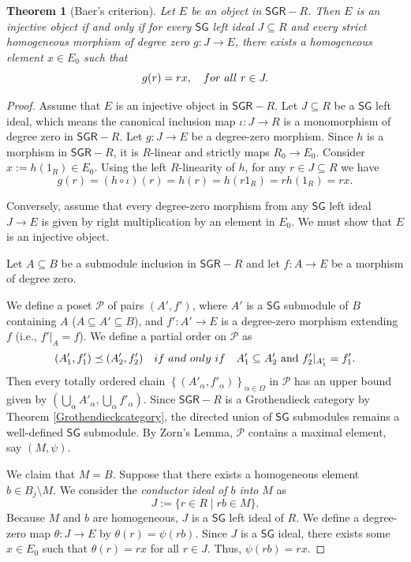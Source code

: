 \documentclass[10pt,a4paper]{amsart}
\newtheorem{theorem}{Theorem}
\begin{document}
\begin{theorem}[Baer's criterion]\label{thm.BaersCriterion}
Let $E$ be an object in $\mathsf{SGR}-R$. Then $E$ is an injective object if and only if for every $\mathsf{SG}$ left ideal $J \subseteq R$ and every strict homogeneous morphism of degree zero $g: J \to E$, there exists a homogeneous element $x \in E_0$ such that 
\[
g(r) = r x, \quad {\rm for\ all } \ r \in J.
\]
\end{theorem}

\begin{proof}
Assume that $E$ is an injective object in $\mathsf{SGR}-R$. Let $J \subseteq R$ be a $\mathsf{SG}$ left ideal, which means the canonical inclusion map $\iota: J \to R$ is a monomorphism of degree zero in $\mathsf{SGR}-R$. Let $g: J \to E$ be a degree-zero morphism. Since $h$ is a morphism in $\mathsf{SGR}-R$, it is $R$-linear and strictly maps $R_0 \to E_0$. Consider $x := h(1_R) \in E_0$. Using the left $R$-linearity of $h$, for any $r \in J \subseteq R$ we have 
\[
g(r) = (h \circ \iota)(r) = h(r) = h(r 1_R) = r h(1_R) = r x.
\]

Conversely, assume that every degree-zero morphism from any $\mathsf{SG}$ left ideal \linebreak $J \to E$ is given by right multiplication by an element in $E_0$. We must show that $E$ is an injective object. 

Let $A \subseteq B$ be a submodule inclusion in $\mathsf{SGR}-R$ and let $f: A \to E$ be a morphism of degree zero. 

We define a poset $\mathcal{P}$ of pairs $(A', f')$, where $A'$ is a $\mathsf{SG}$ submodule of $B$ containing $A$ ($A \subseteq A' \subseteq B$), and $f': A' \to E$ is a degree-zero morphism extending $f$ (i.e., $f'|_{A} = f$). We define a partial order on $\mathcal{P}$ as 
\[
(A'_1, f'_1) \preceq (A'_2, f'_2) \quad {\rm if \ and \ only \ if} \quad A'_1 \subseteq A'_2 \text{ and } f'_2|_{A'_1} = f'_1.
\]
Then every totally ordered chain $\left\{(A'_\alpha, f'_\alpha)\right\}_{\alpha \in \Omega}$ in $\mathcal{P}$ has an upper bound given by $\left(\bigcup_\alpha A'_\alpha, \bigcup_\alpha f'_\alpha\right)$. Since $\mathsf{SGR}-R$ is a Grothendieck category by Theorem \ref{Grothendieckcategory}, the directed union of $\mathsf{SG}$ submodules remains a well-defined $\mathsf{SG}$ submodule. By Zorn's Lemma, $\mathcal{P}$ contains a maximal element, say $(M, \psi)$. 

We claim that $M = B$. Suppose that there exists a homogeneous element $b \in B_j \setminus M$. We consider the {\em conductor ideal of $b$ into} $M$ as
\[
J := \{ r \in R \mid r b \in M \}.
\]
Because $M$ and $b$ are homogeneous, $J$ is a $\mathsf{SG}$ left ideal of $R$. We define a degree-zero map $\theta: J \to E$ by $\theta(r) = \psi(r b)$. Since $J$ is a $\mathsf{SG}$ ideal, there exists some $x \in E_0$ such that $\theta(r) = r x$ for all $r \in J$. Thus, $\psi(r b) = r x$.


\end{proof}
\end{document}
